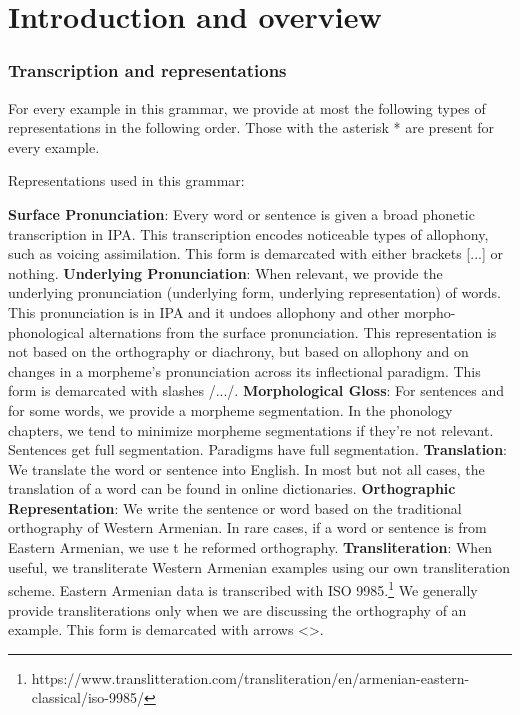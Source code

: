\chapter{Introduction and overview}



\subsection{Transcription and representations}


For every example in this grammar, we provide at most the following types of representations in the following order. Those with the asterisk * are present for every example.  

\begin{enumerate}
	\ex Representations used in this grammar:
	\begin{enumerate}
		\ex  *\textbf{Surface Pronunciation}: Every word or sentence is given a broad phonetic transcription in IPA. This transcription encodes noticeable types of allophony, such as voicing assimilation. This form is demarcated with either brackets [...] or nothing. 
		\ex  \textbf{Underlying Pronunciation}: When relevant, we provide the underlying pronunciation (underlying form, underlying representation) of words. This pronunciation is in IPA and it undoes allophony and other morpho-phonological alternations from the surface pronunciation. This representation is not based on the orthography or diachrony, but based on allophony and on    changes in a morpheme's pronunciation across its inflectional paradigm.  This form is demarcated with slashes /.../. 
		\ex  \textbf{Morphological Gloss}: For sentences and for some words, we provide a morpheme segmentation. In the phonology chapters, we tend to minimize morpheme segmentations if they're not relevant. Sentences get full segmentation. Paradigms have full segmentation. 
		\ex *\textbf{Translation}: We translate the word or sentence into English. In most but not all cases, the translation of a word can be found in online dictionaries. 
		\ex *\textbf{Orthographic Representation}: We write the sentence or word based on the traditional orthography of Western Armenian. In rare cases, if a word or sentence is from Eastern Armenian, we use t he reformed orthography. 
		\ex  \textbf{Transliteration}: When useful, we transliterate Western Armenian examples using our own transliteration scheme. Eastern Armenian data is transcribed with ISO 9985.\footnote{https://www.translitteration.com/transliteration/en/armenian-eastern-classical/iso-9985/} We generally provide transliterations only when we  are discussing the orthography of an example. This form is demarcated with arrows <>. 
		
	\end{enumerate}
\end{enumerate}

